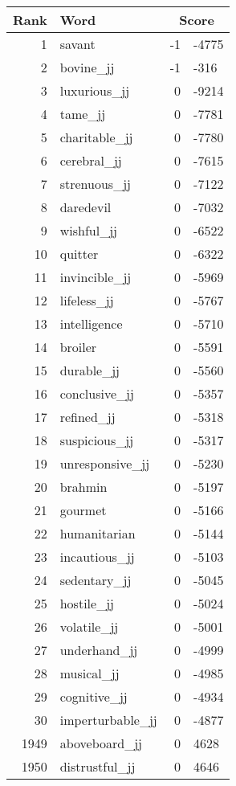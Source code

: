 \begin{longtable}[!htbp]{| rlr@{.}l |}
    \hline
    \textbf{Rank} & \textbf{Word} & \multicolumn{2}{c|}{\textbf{Score}} \\
    \hline
    \endhead
    1 & savant & -1 & -4775 \\
    2 & bovine\_jj & -1 & -316 \\
    3 & luxurious\_jj & 0 & -9214 \\
    4 & tame\_jj & 0 & -7781 \\
    5 & charitable\_jj & 0 & -7780 \\
    6 & cerebral\_jj & 0 & -7615 \\
    7 & strenuous\_jj & 0 & -7122 \\
    8 & daredevil & 0 & -7032 \\
    9 & wishful\_jj & 0 & -6522 \\
    10 & quitter & 0 & -6322 \\
    11 & invincible\_jj & 0 & -5969 \\
    12 & lifeless\_jj & 0 & -5767 \\
    13 & intelligence & 0 & -5710 \\
    14 & broiler & 0 & -5591 \\
    15 & durable\_jj & 0 & -5560 \\
    16 & conclusive\_jj & 0 & -5357 \\
    17 & refined\_jj & 0 & -5318 \\
    18 & suspicious\_jj & 0 & -5317 \\
    19 & unresponsive\_jj & 0 & -5230 \\
    20 & brahmin & 0 & -5197 \\
    21 & gourmet & 0 & -5166 \\
    22 & humanitarian & 0 & -5144 \\
    23 & incautious\_jj & 0 & -5103 \\
    24 & sedentary\_jj & 0 & -5045 \\
    25 & hostile\_jj & 0 & -5024 \\
    26 & volatile\_jj & 0 & -5001 \\
    27 & underhand\_jj & 0 & -4999 \\
    28 & musical\_jj & 0 & -4985 \\
    29 & cognitive\_jj & 0 & -4934 \\
    30 & imperturbable\_jj & 0 & -4877 \\
    1949 & aboveboard\_jj & 0 & 4628 \\
    1950 & distrustful\_jj & 0 & 4646 \\

\end{longtable}
